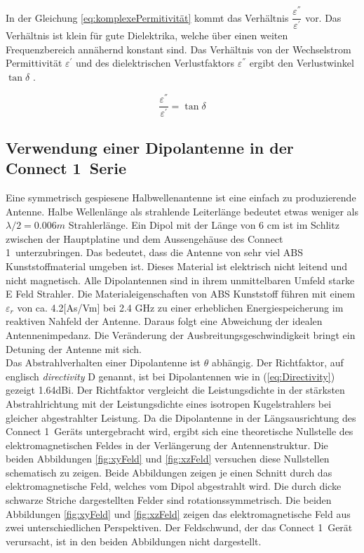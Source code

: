 In der Gleichung \ref{eq:komplexePermitivität} kommt das Verhältnis $\dfrac{\varepsilon^{''}}{\varepsilon^{'}}$ vor. Das Verhältnis ist klein für gute Dielektrika, welche über einen weiten Frequenzbereich annähernd konstant sind. Das Verhältnis von der Wechselstrom Permittivität $\varepsilon^{'}$ und des dielektrischen Verlustfaktors $\varepsilon^{''}$ ergibt den Verlustwinkel $\tan\delta$ \cite{elliott1981antenna}. 

\begin{equation} \label{eq:VerlustwinkelEpsilonPermitivität}
\dfrac{\varepsilon^{''}}{\varepsilon^{'}}=\tan\delta
\end{equation}


\subsection{Verwendung einer Dipolantenne in der  \glqq Connect 1\grqq \  Serie}
Eine symmetrisch gespiesene Halbwellenantenne  ist eine einfach zu produzierende Antenne. Halbe Wellenlänge als strahlende Leiterlänge bedeutet etwas weniger als $\lambda/2=0.006m$ Strahlerlänge. Ein Dipol mit der Länge von 6 cm ist im Schlitz zwischen der Hauptplatine und dem Aussengehäuse des \glqq Connect 1\grqq \ unterzubringen. 
Das bedeutet, dass die Antenne von sehr viel ABS Kunststoffmaterial umgeben ist. Dieses Material ist elektrisch nicht leitend und nicht magnetisch. Alle Dipolantennen sind in ihrem unmittelbaren Umfeld starke E Feld Strahler.  Die Materialeigenschaften von ABS Kunststoff führen mit einem  $\varepsilon_r$ von ca. 4.2[As/Vm] bei 2.4 GHz zu einer erheblichen Energiespeicherung im reaktiven Nahfeld der Antenne. Daraus folgt eine  Abweichung der idealen Antennenimpedanz. Die Veränderung der Ausbreitungsgeschwindigkeit  bringt  ein Detuning der Antenne mit sich.\\

Das Abstrahlverhalten einer Dipolantenne ist $\theta$ abhängig. Der Richtfaktor,  auf englisch \textit{directivity} D genannt, ist bei Dipolantennen wie in  (\ref{eq:Directivity}) gezeigt   1.64dBi.  Der Richtfaktor vergleicht die Leistungsdichte in der stärksten Abstrahlrichtung mit der Leistungsdichte eines isotropen Kugelstrahlers  bei gleicher abgestrahlter Leistung. Da die Dipolantenne in der Längsausrichtung des \glqq Connect 1\grqq \ Geräts untergebracht wird, ergibt sich eine theoretische Nullstelle des elektromagnetischen Feldes in der Verlängerung der Antennenstruktur. Die beiden Abbildungen \ref{fig:xyFeld} und \ref{fig:xzFeld} versuchen diese Nullstellen schematisch zu zeigen. Beide Abbildungen zeigen je einen Schnitt durch das elektromagnetische Feld, welches vom Dipol abgestrahlt wird. Die durch dicke schwarze Striche dargestellten Felder sind rotationssymmetrisch. Die beiden Abbildungen \ref{fig:xyFeld} und \ref{fig:xzFeld} zeigen das elektromagnetische Feld aus zwei unterschiedlichen Perspektiven. Der Feldschwund, der  das \glqq Connect 1\grqq \ Gerät verursacht, ist in den beiden Abbildungen nicht dargestellt.


